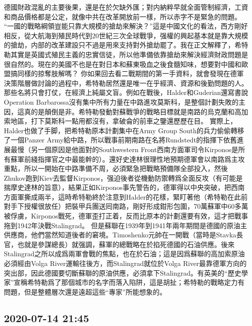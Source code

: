 \documentclass[twocolumn]{ctexart}
\begin{document}
德國財政混亂的主要後果，還是在於欠缺外匯；對内納粹早就全面管制經濟，工資和商品價格都是公定，就像中共在改革開放前一樣，所以赤字不是緊急的問題。
“一國的戰略綱領豈能只靠大規模的搶劫來解決？”這是中國文化的看法，西方剛好相反，從大航海到殖民時代到20世紀三次全球戰爭，强權的興起基本就是靠大規模的搶劫，内部的改革建設只不過是用來支持對外搶劫罷了。我在正文解釋了，希特勒其實是英國式殖民主義的忠實信徒，所以他準備依靠搶劫來解決經濟財政問題是很自然的。現在的美國不也是在對日本和蘇東吸血之後食髓知味，想要對中國和歐盟搞同樣的掠奪肢解嗎？
你如果回去看二戰期間的第一手資料，就會發現在德軍決策階層做討論的過程中，希特勒居然還是唯一在乎經濟、資源和後勤問題的人。那些名將只會打仗，在經濟上純屬文盲。例如在戰後，Halder和Guderian還寫書說Operation Barbarossa沒有集中所有力量在中路進攻莫斯科，是整個計劃失敗的主因，這真的是顛倒是非。希特勒發動對蘇戰爭的戰略目標就是南路的烏克蘭和高加索地區，打下莫斯科一點用都沒有，拿破侖的前車之鑒還歷歷在目。
實際上，Halder也做了手脚，把希特勒原本計劃集中在Army Group South的兵力偷偷轉移了一個Panzer Army給中路，所以戰事前期南路在名將Rundstedt的指揮下依舊進展最慢（另一個原因是他面對的Southwestern Front西南方面軍司令Kirponos是所有蘇軍前綫指揮官之中最能幹的）。還好史達林很理性地預期德軍會以南路爲主攻重點，所以一開始在中路準備不周，必須緊急把戰略預備隊全部投入，然後Zhukov跑到Kiev去監督Kirponos，强迫後者從機動防禦轉爲全面反攻（有可能是揣摩史達林的旨意），結果正如Kirponos事先警告的，德軍得以中央突破，把西南方面軍撕成兩半，這時希特勒終於注意到Halder的花樣，緊盯著他（希特勒在此前對手下授權很放任）把裝甲兵團送囘南路，剛好形成鉗形包圍，70萬蘇軍中60多萬被俘虜，Kirponos戰死，德軍歪打正着，反而比原本的計劃還要有效，這才把戰事拖到1942年決戰Stalingrad。
但是蘇聯在1939年到1941年兩年期間是德國的原油主供應商，他們當然知道後者的窘境。Timoshenko元帥在一開戰（當時是Stavka長官，也就是參謀總長）就强調，蘇軍的總戰略在於掐死德國的石油供應。後來Stalingrad之所以成爲兩軍會戰的焦點，也在於石油；這是因爲蘇聯的高加索原油必須經由Volga River運輸往後方，而Stalingrad就位於Volga River最靠德軍方向的突出部，因此德國要切斷蘇聯的原油供應，必須拿下Stalingrad。有英美的“歷史學家”宣稱希特勒爲了那個城市的名字而落入陷阱，這是胡扯；希特勒的戰略定力有問題，但是整體層次還是遠超這些“專家”所能想象的。
\subsection*{2020-07-14 21:45}
\end{document}
